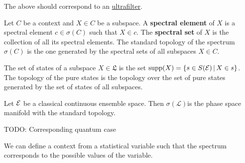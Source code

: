 \begin{remark}
	The above should correspond to an \href{https://en.wikipedia.org/wiki/Ultrafilter}{ultrafilter}.
\end{remark}

\begin{defn}
	Let $C$ be a context and $X \in C$ be a subspace. A \textbf{spectral element} of $X$ is a spectral element $c \in \sigma(C)$ such that $X \in c$. The \textbf{spectral set} of $X$ is the collection of all its spectral elements. The standard topology of the spectrum $\sigma(C)$ is the one generated by the spectral sets of all subspaces $X \in C$.
\end{defn}

\begin{defn}
	The set of states of a subspace $X \in \mathfrak{L}$ is the set $\mathrm{supp}(X) = \{ s \in S(\mathcal{E}) \, | \, X \in s \}$. The topology of the pure states is the topology over the set of pure states generated by the set of states of all subspaces.
\end{defn}

\begin{conj}
	Let $\mathcal{E}$ be a classical continuous ensemble space. Then $\sigma(\mathcal{L})$is the phase space manifold with the standard topology.
\end{conj}

\begin{conj}
	TODO: Corresponding quantum case
\end{conj}

\begin{conj}
	We can define a context from a statistical variable such that the spectrum corresponds to the possible values of the variable.
\end{conj}

\fi
